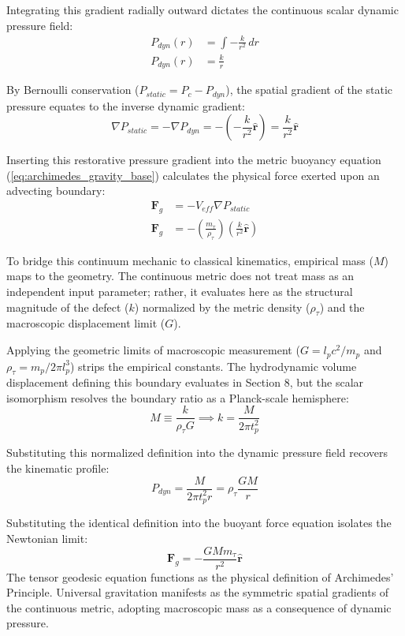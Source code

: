Integrating this gradient radially outward dictates the continuous scalar dynamic pressure field:
\begin{align}
    P_{dyn}(r) &= \int -\frac{k}{r^2} \, dr \nonumber \\
    P_{dyn}(r) &= \frac{k}{r}
\end{align}

By Bernoulli conservation ($P_{static} = P_c - P_{dyn}$), the spatial gradient of the static pressure equates to the inverse dynamic gradient:
\begin{equation}
    \nabla P_{static} = -\nabla P_{dyn} = - \left( -\frac{k}{r^2} \mathbf{\hat{r}} \right) = \frac{k}{r^2} \mathbf{\hat{r}}
\end{equation}

Inserting this restorative pressure gradient into the metric buoyancy equation (\ref{eq:archimedes_gravity_base}) calculates the physical force exerted upon an advecting boundary:
\begin{align}
    \mathbf{F}_g &= - V_{eff} \nabla P_{static} \nonumber \\
    \mathbf{F}_g &= - \left( \frac{m_\tau}{\rho_\tau} \right) \left( \frac{k}{r^2} \mathbf{\hat{r}} \right)
\end{align}

To bridge this continuum mechanic to classical kinematics, empirical mass ($M$) maps to the geometry. The continuous metric does not treat mass as an independent input parameter; rather, it evaluates here as the structural magnitude of the defect ($k$) normalized by the metric density ($\rho_\tau$) and the macroscopic displacement limit ($G$). 

Applying the geometric limits of macroscopic measurement ($G = l_p c^2 / m_p$ and $\rho_\tau = m_p / 2\pi l_p^3$) strips the empirical constants. The hydrodynamic volume displacement defining this boundary evaluates in Section 8, but the scalar isomorphism resolves the boundary ratio as a Planck-scale hemisphere:
\begin{equation}
    M \equiv \frac{k}{\rho_\tau G} \implies k = \frac{M}{2\pi t_p^2}
\end{equation}

Substituting this normalized definition into the dynamic pressure field recovers the kinematic profile: 
\begin{equation}
    P_{dyn} = \frac{M}{2\pi t_p^2 r} = \rho_\tau \frac{GM}{r} \label{eq:derived_pdyn}
\end{equation}

Substituting the identical definition into the buoyant force equation isolates the Newtonian limit:
\begin{equation}
    \mathbf{F}_g = - \frac{G M m_\tau}{r^2} \mathbf{\hat{r}} \label{eq:newtonian_limit}
\end{equation}
The tensor geodesic equation functions as the physical definition of Archimedes' Principle. Universal gravitation manifests as the symmetric spatial gradients of the continuous metric, adopting macroscopic mass as a consequence of dynamic pressure.


